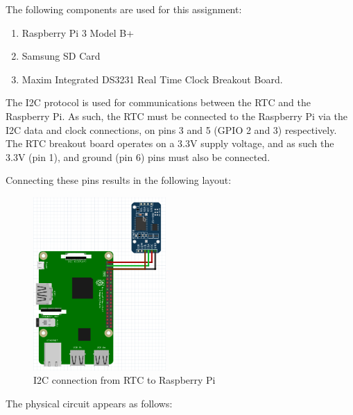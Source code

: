The following components are used for this assignment:

\begin{enumerate}
	\item Raspberry Pi 3 Model B+
	\item Samsung SD Card
	\item Maxim Integrated DS3231 Real Time Clock Breakout Board.
\end{enumerate}

The I2C protocol is used for communications between the RTC and the Raspberry
Pi. As such, the RTC must be connected to the Raspberry Pi via the I2C data and
clock connections, on pins 3 and 5 (GPIO 2 and 3) respectively. The RTC breakout
board operates on a 3.3V supply voltage, and as such the 3.3V (pin 1), and
ground (pin 6) pins must also be connected.

Connecting these pins results in the following layout:

\begin{figure}[H]
	\centering
	\includegraphics[width=0.45\textwidth, angle=90]{images/circuit}
	\caption{I2C connection from RTC to Raspberry Pi}
	\label{fig:i2c}
\end{figure}

The physical circuit appears as follows:
